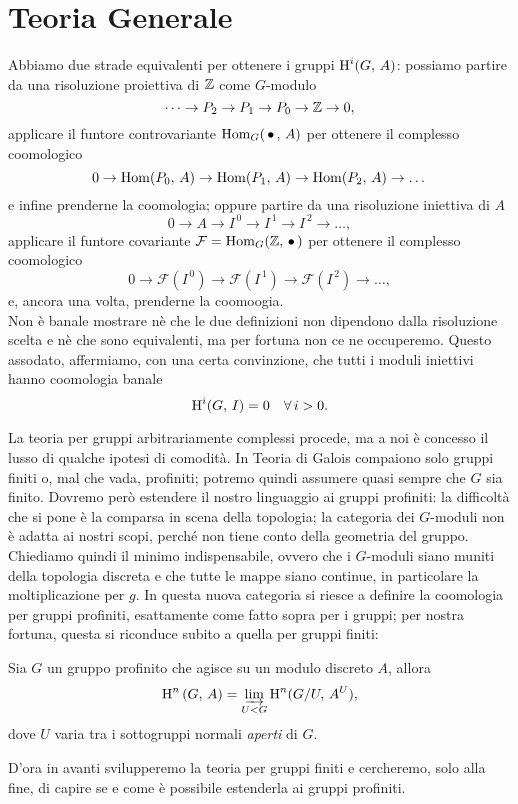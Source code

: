 \section{Teoria Generale}
Abbiamo due strade equivalenti per ottenere i gruppi $ \operatorname{H}^i(G, \, A) $: possiamo partire da una risoluzione proiettiva di $ \mathbb{Z} $ come $ G $-modulo
\[ \dots \to P_2 \to P_1 \to P_0 \to \mathbb{Z} \to 0, \]
applicare il funtore controvariante $ \operatorname{Hom}_G(\, \bullet\,, \, A) $ per ottenere il complesso coomologico
\[ 0 \to \operatorname{Hom}(P_0, \, A) \to \operatorname{Hom}(P_1, \, A) \to \operatorname{Hom}(P_2, \, A) \to \dots \]
e infine prenderne la coomologia; oppure partire da una risoluzione iniettiva di $ A $
\[ 0 \to A \to I^{\,0} \to I^{\,1} \to I^{\,2} \to \dots, \]
applicare il funtore covariante $ \mathcal{F} = \operatorname{Hom}_G(\mathbb{Z}, \, \bullet \, ) $ per ottenere il complesso coomologico
\[ 0 \to \mathcal{F}\left(I^{\,0}\right) \to \mathcal{F}\left(I^{\,1}\right) \to \mathcal{F}\left(I^{\,2}\right) \to \dots, \]
e, ancora una volta, prenderne la coomoogia. \\

Non è banale mostrare nè che le due definizioni non dipendono dalla risoluzione scelta e nè che sono equivalenti, ma per fortuna non ce ne occuperemo. Questo assodato, affermiamo, con una certa convinzione, che tutti i moduli iniettivi hanno coomologia banale
\begin{equation} \label{injban}
	\operatorname{H}^i(G, \, I) = 0 \quad \forall \, i > 0.
\end{equation}


\begin{profinite}
La teoria per gruppi arbitrariamente complessi procede, ma a noi è concesso il lusso di qualche ipotesi di comodità. In Teoria di Galois compaiono solo gruppi finiti o, mal che vada, profiniti; potremo quindi assumere quasi sempre che $ G $ sia finito.
Dovremo però estendere il nostro linguaggio ai gruppi profiniti: la difficoltà che si pone è la comparsa in scena della topologia; la categoria dei $ G $-moduli non è adatta ai nostri scopi, perché non tiene conto della geometria del gruppo. Chiediamo quindi il minimo indispensabile, ovvero che i $ G $-moduli siano muniti della topologia discreta e che tutte le mappe siano continue, in particolare la moltiplicazione per $ g $. In questa nuova categoria si riesce a definire la coomologia per gruppi profiniti, esattamente come fatto sopra per i gruppi; per nostra fortuna, questa si riconduce subito a quella per gruppi finiti:

\begin{proposition}\label{limite}
	Sia $ G $ un gruppo profinito che agisce su un modulo discreto $ A $, allora
	\[ \operatorname{H}^n \left(G, \, A \right)  = \varinjlim_{U < G} \operatorname{H}^n(G/U, \, A^U), \]
	dove $ U $ varia tra i sottogruppi normali \emph{aperti} di $ G $.
\end{proposition}

D'ora in avanti svilupperemo la teoria per gruppi finiti e cercheremo, solo alla fine, di capire se e come è possibile estenderla ai gruppi profiniti.
\end{profinite}

